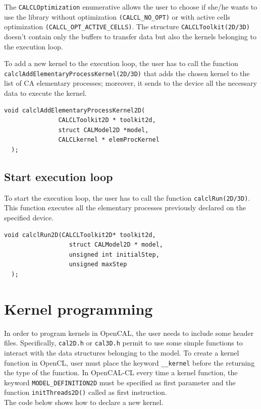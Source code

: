 The \verb'CALCLOptimization' enumerative allows the user to choose if
she/he wants to use the library without optimization
\verb|(CALCL_NO_OPT)| or with active cells optimization
\verb|(CALCL_OPT_ACTIVE_CELLS)|. The structure
\verb'CALCLToolkit(2D/3D)' doesn't contain only the buffers to
transfer data but also the kernels belonging to the execution
loop.

To add a new kernel to the execution loop, the user has to
call the function \verb'calclAddElementaryProcessKernel(2D/3D)' that
adds the chosen kernel to the list of CA elementary processes;
moreover, it sends to the device all the necessary data to execute the
kernel.

\begin{lstlisting}[numbers=none]
  void calclAddElementaryProcessKernel2D(
               CALCLToolkit2D * toolkit2d,
               struct CALModel2D *model,
               CALCLkernel * elemProcKernel
  );
\end{lstlisting}


\subsection{Start execution loop}

To start the execution loop, the user has to call the function
\verb'calclRun(2D/3D)'. This function executes all the elementary
processes previously declared on the specified device.

\begin{lstlisting}[numbers=none]
  void calclRun2D(CALCLToolkit2D* toolkit2d,
                  struct CALModel2D * model,
                  unsigned int initialStep,
                  unsigned maxStep
  );
\end{lstlisting}


\section{Kernel programming}

In order to program kernels in OpenCAL, the user needs to include some
header files.  Specifically, \verb'cal2D.h' or \verb'cal3D.h' permit
to use some simple functions to interact with the data structures
belonging to the model. To create a kernel function in OpenCL, user
must place the keyword \verb'__kernel' before the returning the type
of the function. In OpenCAL-CL every time a kernel function, the
keyword \verb'MODEL_DEFINITION2D' must be specified as first parameter
and the function \verb'initThreads2D()' called as first
instruction.\\ The code below shows how to declare a new kernel.

